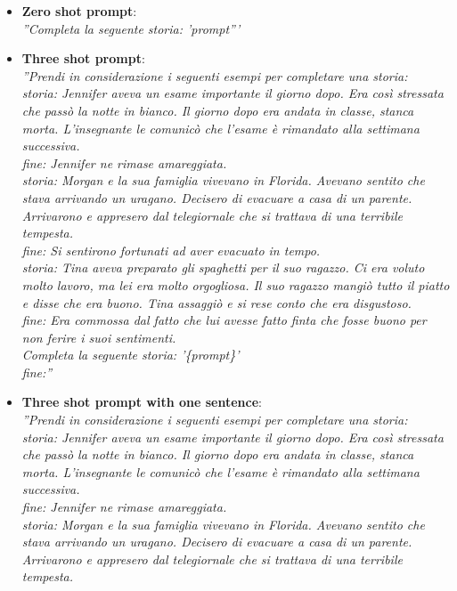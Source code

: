 \begin{itemize}
    \item \textbf{Zero shot prompt}: \\ \emph{''Completa la seguente storia: '{prompt}'''}
    \item \textbf{Three shot prompt}: \\ \emph{''Prendi in considerazione i seguenti esempi per completare una storia:\\
                storia: Jennifer aveva un esame importante il giorno dopo.	Era così stressata che passò la notte in bianco.	Il giorno dopo era andata in classe, stanca morta.	L'insegnante le comunicò che l'esame è rimandato alla settimana successiva.\\
                fine: Jennifer ne rimase amareggiata.\\
                storia: Morgan e la sua famiglia vivevano in Florida.	Avevano sentito che stava arrivando un uragano.	Decisero di evacuare a casa di un parente.	Arrivarono e appresero dal telegiornale che si trattava di una terribile tempesta.\\
                fine: Si sentirono fortunati ad aver evacuato in tempo.\\
                storia: Tina aveva preparato gli spaghetti per il suo ragazzo.	Ci era voluto molto lavoro, ma lei era molto orgogliosa.	Il suo ragazzo mangiò tutto il piatto e disse che era buono.	Tina assaggiò e si rese conto che era disgustoso.\\
                fine: Era commossa dal fatto che lui avesse fatto finta che fosse buono per non ferire i suoi sentimenti.\\
                Completa la seguente storia: '\{prompt\}'\\
                fine:''}
    \item \textbf{Three shot prompt with one sentence}: \\ \emph{''Prendi in considerazione i seguenti esempi per completare una storia:\\
                storia: Jennifer aveva un esame importante il giorno dopo.	Era così stressata che passò la notte in bianco.	Il giorno dopo era andata in classe, stanca morta.	L'insegnante le comunicò che l'esame è rimandato alla settimana successiva.\\
                fine: Jennifer ne rimase amareggiata.\\
                storia: Morgan e la sua famiglia vivevano in Florida.	Avevano sentito che stava arrivando un uragano.	Decisero di evacuare a casa di un parente.	Arrivarono e appresero dal telegiornale che si trattava di una terribile tempesta.\\
}
\end{itemize}
